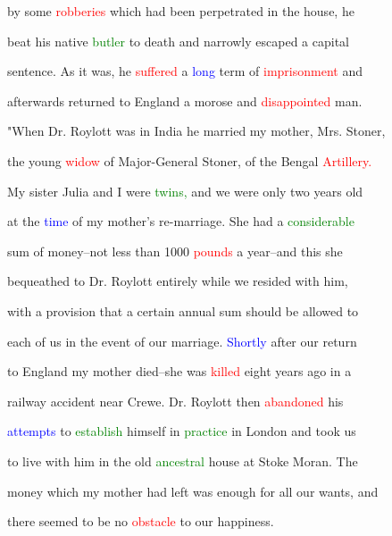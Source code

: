  by some \textcolor{red}{robberies} which had been perpetrated in the house, he

 beat his native \textcolor{green}{butler} to \textcolor{BurntOrange}{death} and narrowly \textcolor{BurntOrange}{escaped} a capital

 \textcolor{BurntOrange}{sentence.} As it was, he \textcolor{red}{suffered} a \textcolor{blue}{long} term of \textcolor{red}{imprisonment} and

 afterwards returned to England a morose and \textcolor{red}{disappointed} man.



 "When Dr. Roylott was in India he married my \textcolor{BurntOrange}{mother,} Mrs. Stoner,

 the \textcolor{BurntOrange}{young} \textcolor{red}{widow} of Major-General Stoner, of the Bengal \textcolor{red}{Artillery.}

 My sister Julia and I were \textcolor{green}{twins,} and we were only two years old

 at the \textcolor{blue}{time} of my \textcolor{BurntOrange}{mother's} re-marriage. She had a \textcolor{green}{considerable}

 sum of money--not less than 1000 \textcolor{red}{pounds} a year--and this she

 bequeathed to Dr. Roylott entirely while we resided with him,

 with a provision that a certain annual sum should be allowed to

 each of us in the event of our \textcolor{BurntOrange}{marriage.} \textcolor{blue}{Shortly} after our return

 to England my \textcolor{BurntOrange}{mother} died--she was \textcolor{red}{killed} eight years ago in a

 railway \textcolor{BurntOrange}{accident} near Crewe. Dr. Roylott then \textcolor{red}{abandoned} his

 \textcolor{blue}{attempts} to \textcolor{green}{establish} himself in \textcolor{green}{practice} in London and took us

 to live with him in the old \textcolor{green}{ancestral} house at Stoke Moran. The

 \textcolor{BurntOrange}{money} which my \textcolor{BurntOrange}{mother} had left was enough for all our wants, and

 there seemed to be no \textcolor{red}{obstacle} to our \textcolor{BurntOrange}{happiness.}




